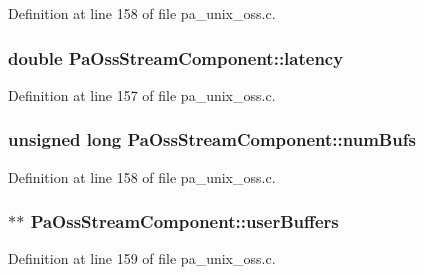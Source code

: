 Definition at line 158 of file pa\+\_\+unix\+\_\+oss.\+c.

\subsubsection[{\texorpdfstring{latency}{latency}}]{\setlength{\rightskip}{0pt plus 5cm}double Pa\+Oss\+Stream\+Component\+::latency}\hypertarget{struct_pa_oss_stream_component_a1d75c6753337e2e1b41b7208dce08cf5}{}\label{struct_pa_oss_stream_component_a1d75c6753337e2e1b41b7208dce08cf5}


Definition at line 157 of file pa\+\_\+unix\+\_\+oss.\+c.

\subsubsection[{\texorpdfstring{num\+Bufs}{numBufs}}]{\setlength{\rightskip}{0pt plus 5cm}unsigned long Pa\+Oss\+Stream\+Component\+::num\+Bufs}\hypertarget{struct_pa_oss_stream_component_ad912ac4010429731817692641b7181ec}{}\label{struct_pa_oss_stream_component_ad912ac4010429731817692641b7181ec}


Definition at line 158 of file pa\+\_\+unix\+\_\+oss.\+c.

\subsubsection[{\texorpdfstring{user\+Buffers}{userBuffers}}]{$\ast$$\ast$ Pa\+Oss\+Stream\+Component\+::user\+Buffers}\hypertarget{struct_pa_oss_stream_component_a416e24ef585da06a25b1a651c6da9154}{}\label{struct_pa_oss_stream_component_a416e24ef585da06a25b1a651c6da9154}


Definition at line 159 of file pa\+\_\+unix\+\_\+oss.\+c.

